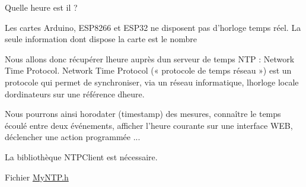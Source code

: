 Quelle heure est il ?

Les cartes Arduino, ESP8266 et ESP32 ne disposent pas d’horloge temps réel. La seule information dont dispose la carte est le nombre

Nous allons donc récupérer l\textquotesingle{}heure auprès d\textquotesingle{}un serveur de temps NTP \+: Network Time Protocol. Network Time Protocol (« protocole de temps réseau ») est un protocole qui permet de synchroniser, via un réseau informatique, l\textquotesingle{}horloge locale d\textquotesingle{}ordinateurs sur une référence d\textquotesingle{}heure.

Nous pourrons ainsi horodater (timestamp) des mesures, connaître le temps écoulé entre deux événements, afficher l’heure courante sur une interface WEB, déclencher une action programmée ...

La bibliothèque NTPClient est nécessaire.

Fichier \mbox{\hyperlink{_my_n_t_p_8h}{My\+NTP.\+h}} 
